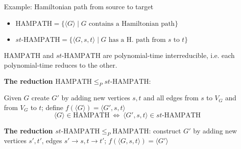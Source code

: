 \documentclass[handout]{beamer}
\begin{document}
\begin{frame}{Example: Hamiltonian path from source to target}
   
    \begin{itemize}
        \item $\mathrm{HAMPATH}=\{\langle G\rangle\mid G\text{ contains a Hamiltonian path}\}$
        \item $st$-$\mathrm{HAMPATH}=\{\langle G,s,t\rangle\mid G\text{ has a H. path from $s$ to $t$}\}$
    \end{itemize}
    
    \begin{example}
        $\mathrm{HAMPATH}$ and $st$-$\mathrm{HAMPATH}$ are \alert{polynomial-time interreducible}, i.e. each polynomial-time reduces to the other.
    \end{example}

    \textbf{The reduction $\mathrm{HAMPATH}\leq_P st\text{-}\mathrm{HAMPATH}$}:
    
    Given $G$ create $G'$ by adding new vertices $s,t$ and all edges from $s$ to $V_G$ and from $V_G$ to $t$; define $f(\langle G\rangle)=\langle G',s,t\rangle$    
    $$
    \langle G\rangle\in\mathrm{HAMPATH}\ \Leftrightarrow\ \langle G',s,t\rangle\in st\text{-}\mathrm{HAMPATH}
    $$

    \textbf{The reduction $st\text{-}\mathrm{HAMPATH}\leq_P \mathrm{HAMPATH}$}:
    construct $G'$ by adding new vertices $s',t'$, edges $s'\to s,t\to t'$; $f(\langle G,s,t\rangle)=\langle G'\rangle$   

\end{frame}
\end{document}
